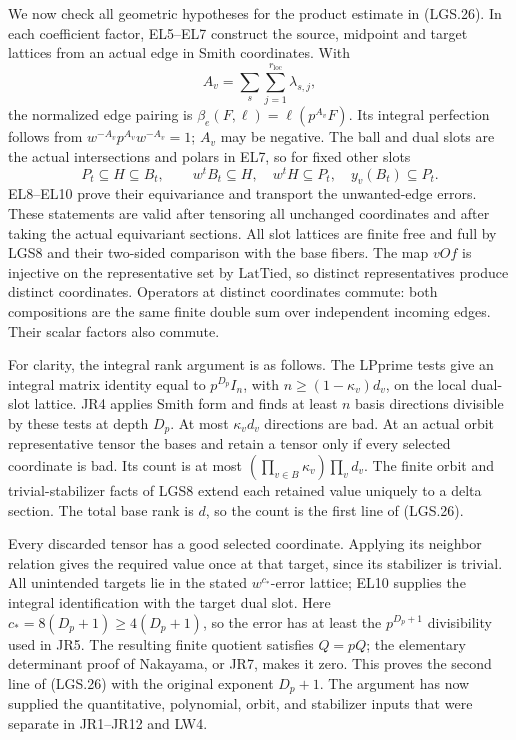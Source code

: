 \documentclass[11pt,a4paper]{article}
\numberwithin{equation}{section}
\theoremstyle{remark}\newtheorem{remark}[theorem]{Remark}
\begin{document}
We now check all geometric hypotheses for the product
estimate in (LGS.26).  In each coefficient factor, EL5--EL7
construct the source, midpoint and target lattices from an
actual edge in Smith coordinates.  With
\[
 A_v=\sum_s\sum_{j=1}^{r_{\mathrm{loc}}}\lambda_{s,j},
 \]
the normalized edge pairing is
\(\beta_e(F,\ell)=\ell(p^{A_v}F)\).
Its integral perfection follows from
\(w^{-A_v}p^{A_v}w^{-A_v}=1\); \(A_v\) may be negative.
The ball and dual slots are the actual intersections and
polars in EL7, so for fixed other slots
\[
 P_t\subseteq H\subseteq B_t,\qquad
 w^tB_t\subseteq H,\quad w^tH\subseteq P_t,\quad
 y_v(B_t)\subseteq P_t.                                \tag{LGS.27}
\]
EL8--EL10 prove their equivariance and transport the
unwanted-edge errors.  These statements are valid after
tensoring all unchanged coordinates and after taking
the actual equivariant sections.  All slot lattices are
finite free and full by LGS8 and their two-sided
comparison with the base fibers.
The map \(vOf\) is injective on the representative set
by \(\mathrm{LatTied}\), so distinct representatives
produce distinct coordinates.  Operators at distinct
coordinates commute: both compositions are the same
finite double sum over independent incoming edges.
Their scalar factors also commute.

For clarity, the integral rank argument is as follows.
The \(\mathrm{LPprime}\) tests give an integral matrix
identity equal to \(p^{D_p}I_n\), with
\(n\ge(1-\kappa_v)d_v\), on the local dual-slot lattice.
JR4 applies Smith form and finds at least \(n\) basis
directions divisible by these tests at depth \(D_p\).
At most \(\kappa_vd_v\) directions are bad.
At an actual orbit representative tensor the bases and
retain a tensor only if every selected coordinate is bad.
Its count is at most
\((\prod_{v\in B}\kappa_v)\prod_vd_v\).
The finite orbit and trivial-stabilizer facts of LGS8
extend each retained value uniquely to a delta section.
The total base rank is \(d\), so the count is the first
line of (LGS.26).

Every discarded tensor has a good selected coordinate.
Applying its neighbor relation gives the required value
once at that target, since its stabilizer is trivial.
All unintended targets lie in the stated
\(w^{c_*}\)-error lattice; EL10 supplies the integral
identification with the target dual slot.
Here \(c_*=8(D_p+1)\ge4(D_p+1)\), so the error has
at least the \(p^{D_p+1}\) divisibility used in JR5.
The resulting finite quotient satisfies \(Q=pQ\);
the elementary determinant proof of Nakayama, or JR7,
makes it zero.  This proves the second line of
(LGS.26) with the original exponent \(D_p+1\).
The argument has now supplied the quantitative,
polynomial, orbit, and stabilizer inputs that were
separate in JR1--JR12 and LW4.
\end{document}
